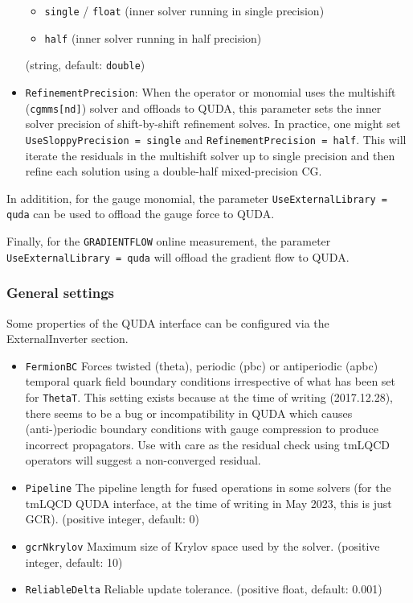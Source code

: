 \begin{itemize}
\begin{itemize}
      \item \texttt{single} / \texttt{float} (inner solver running in single precision)
      \item \texttt{half} (inner solver running in half precision)
    \end{itemize}
    (string, default: \texttt{double})
  \item \texttt{RefinementPrecision}: When the operator or monomial uses the multishift (\texttt{cgmms[nd]}) solver and offloads to QUDA, this parameter sets the inner solver precision of shift-by-shift refinement solves. In practice, one might set \texttt{UseSloppyPrecision = single} and \texttt{RefinementPrecision = half}. This will iterate the residuals in the multishift solver up to single precision and then refine each solution using a double-half mixed-precision CG.
\end{itemize}

In additition, for the gauge monomial, the parameter \texttt{UseExternalLibrary = quda} can be used to offload the gauge force to QUDA.

Finally, for the \texttt{GRADIENTFLOW} online measurement, the parameter \texttt{UseExternalLibrary = quda} will offload the gradient flow to QUDA.

\subsubsection{General settings}
Some properties of the QUDA interface can be configured via the {\ttfamily ExternalInverter} section.
\begin{itemize}
  \item \texttt{FermionBC} Forces twisted ({\ttfamily theta}), periodic ({\ttfamily pbc}) or antiperiodic ({\ttfamily apbc}) temporal quark field boundary conditions irrespective of what has been set for \texttt{ThetaT}. This setting exists because at the time of writing (2017.12.28), there seems to be a bug or incompatibility in QUDA which causes (anti-)periodic boundary conditions with gauge compression to produce incorrect propagators. Use with care as the residual check using tmLQCD operators will suggest a non-converged residual.
  \item \texttt{Pipeline} The pipeline length for fused operations in some solvers (for the tmLQCD QUDA interface, at the time of writing in May 2023, this is just GCR). (positive integer, default: $0$)
  \item \texttt{gcrNkrylov} Maximum size of Krylov space used by the solver. (positive integer, default: 10)
  \item \texttt{ReliableDelta} Reliable update tolerance. (positive float, default: 0.001)
\end{itemize}

